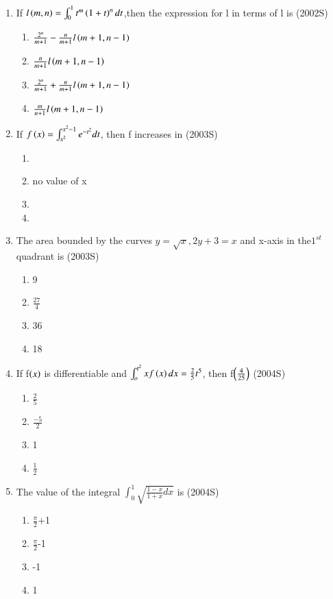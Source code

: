 \documentclass[journal,12pt,twocolumn]{IEEEtran}
\theoremstyle{remark}
\begin{document}
\begin{enumerate}
   \item If $l\left(m,n\right)=\int_{0}^{1} t^{m}\left(1+t\right)^{n} dt$,then the expression for l in terms of l is
	   \hfill(2002S)
\begin{enumerate}
 \item $\frac{2^{n}}{m+1} -\frac{n}{m+1}l\left(m+1,n-1\right)$
 \item $\frac{n}{m+1}l\left(m+1,n-1\right)$
 \item$ \frac{2^{n}}{m+1}+\frac{n}{m+1}l\left(m+1,n-1\right)$
 \item $\frac{m}{n+1}l\left(m+1,n-1\right)$
\end{enumerate}
\item If $f\left(x\right)=\int_{x^{2}}^{x^{2}-1} e^{-t^{2}}dt$, then f increases in
	\hfill(2003S)
\begin{enumerate}
    \item {}
    \item no value of x
    \item {}
    \item {}
\end{enumerate}
  \item The area bounded by the curves $ y=\sqrt{x},2y+3=x$  and x-axis in the$ 1^{st}$ quadrant is
	  \hfill(2003S)
\begin{enumerate}
    \item 9
    \item $\frac{27}{4}$
    \item 36
    \item 18
\end{enumerate}
 \item If f$\left(x\right)$ is differentiable and $\int_{o}^{t^{2}}xf\left(x\right)dx=\frac{2}{5}t^{5}$, then f$\left(\frac{4}{25}\right)$
	 \hfill(2004S)
 \begin{enumerate}
	 \item $\frac{2}{5}$
	 \item $\frac{-5}{2}$
     \item 1
     \item $\frac{1}{2}$
 \end{enumerate}
 \item The value of the integral $\int_{0}^{1}\sqrt{\frac{1-x}{1+x}dx}$ is
	 \hfill(2004S)
\begin{enumerate}
 \item $\frac{\pi}{2}$+1
 \item $\frac{\pi}{2}$-1
 \item -1
 \item 1

\end{enumerate}
\end{enumerate}
\end{document}

